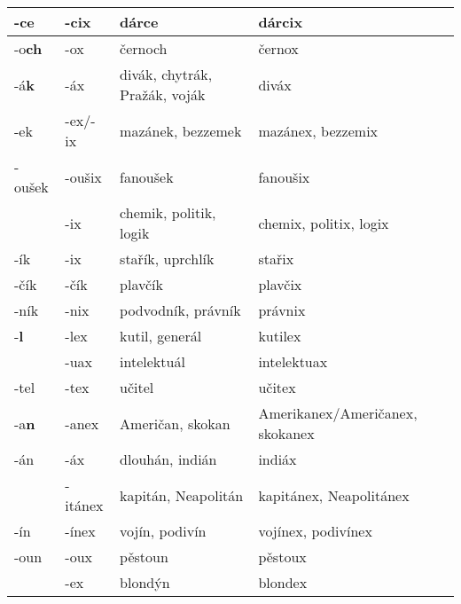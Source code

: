 \begin{table}
{\begin{longtabu}{|X[1,R]|X[1,R]|X[3,L]|X[3,L]|}
-c\textbf{e}    &-cix   &dárce              &dárcix\\\hline%

-o\textbf{ch}   &-ox    &černoch            &černox\\\hline%

-á\textbf{k}    &-áx    &divák, chytrák, Pražák, voják  &diváx\\\hline%
-ek             &-ex/-ix&mazánek, bezzemek& mazánex, bezzemix\\\hline%
-oušek          &-oušix &fanoušek           &fanoušix\\\hline%
&-ix    &chemik, politik, logik&chemix, politix, logix\\\hline%
-ík             &-ix    &stařík, uprchlík   &stařix\\\hline%
-čík            &-čík   &plavčík & plavčix\\\hline%
-ník            &-nix   &podvodník, právník &právnix\\\hline%

-\textbf{l}     &-lex   &kutil, generál     &kutilex\\\hline%
&-uax   &intelektuál        &intelektuax\\\hline%
-tel            &-tex   &učitel             &učitex\\\hline%

-a\textbf{n}    &-anex  &Američan, skokan   &Amerikanex/Američanex, skokanex\\\hline%
-án             &-áx    &dlouhán, indián    &indiáx\\\hline%
&-itánex &kapitán, Neapolitán&kapitánex, Neapolitánex\\\hline%
-ín             &-ínex  &vojín, podivín &vojínex, podivínex\\\hline%
-oun            &-oux   &pěstoun    &pěstoux\\\hline%
&-ex    &blondýn            &blondex\\\hline%


\end{longtabu}}
\end{table}
